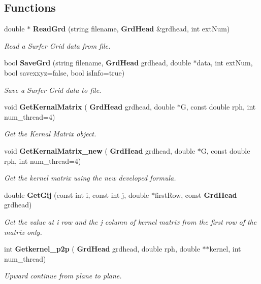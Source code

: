 \subsection*{Functions}
\begin{DoxyCompactItemize}
\item 
double $\ast$ \textbf{ Read\+Grd} (string filename, \textbf{ Grd\+Head} \&grdhead, int ext\+Num)
\begin{DoxyCompactList}\small\item\em Read a Surfer Grid data from file. \end{DoxyCompactList}\item 
bool \textbf{ Save\+Grd} (string filename, \textbf{ Grd\+Head} grdhead, double $\ast$data, int ext\+Num, bool savexxyz=false, bool is\+Info=true)
\begin{DoxyCompactList}\small\item\em Save a Surfer Grid data to file. \end{DoxyCompactList}\item 
void \textbf{ Get\+Kernal\+Matrix} (\textbf{ Grd\+Head} grdhead, double $\ast$G, const double rph, int num\+\_\+thread=4)
\begin{DoxyCompactList}\small\item\em Get the Kernal Matrix object. \end{DoxyCompactList}\item 
void \textbf{ Get\+Kernal\+Matrix\+\_\+new} (\textbf{ Grd\+Head} grdhead, double $\ast$G, const double rph, int num\+\_\+thread=4)
\begin{DoxyCompactList}\small\item\em Get the kernel matrix using the new developed formula. \end{DoxyCompactList}\item 
double \textbf{ Get\+Gij} (const int i, const int j, double $\ast$first\+Row, const \textbf{ Grd\+Head} grdhead)
\begin{DoxyCompactList}\small\item\em Get the value at i row and the j column of kernel matrix from the first row of the matrix only. \end{DoxyCompactList}\item 
int \textbf{ Getkernel\+\_\+p2p} (\textbf{ Grd\+Head} grdhead, double rph, double $\ast$$\ast$kernel, int num\+\_\+thread)
\begin{DoxyCompactList}\small\item\em Upward continue from plane to plane. \end{DoxyCompactList}\item 
$$
\end{DoxyCompactItemize}
